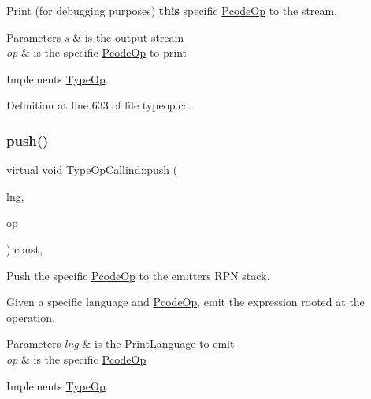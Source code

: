 Print (for debugging purposes) {\bfseries{this}} specific \mbox{\hyperlink{class_pcode_op}{Pcode\+Op}} to the stream. 


\begin{DoxyParams}{Parameters}
{\em s} & is the output stream \\
\hline
{\em op} & is the specific \mbox{\hyperlink{class_pcode_op}{Pcode\+Op}} to print \\
\hline
\end{DoxyParams}


Implements \mbox{\hyperlink{class_type_op_a60717e486917a30cc7cb6e3ce02585e1}{Type\+Op}}.



Definition at line 633 of file typeop.\+cc.

\mbox{\label{class_type_op_callind_adcb3858720f0774e85cb5e2e7ced8abd}} 
\subsubsection{\texorpdfstring{push()}{push()}}
{\footnotesize\ttfamily virtual void Type\+Op\+Callind\+::push (\begin{DoxyParamCaption}\item[{\mbox{\hyperlink{class_print_language}{Print\+Language}} $\ast$}]{lng,  }\item[{const \mbox{\hyperlink{class_pcode_op}{Pcode\+Op}} $\ast$}]{op }\end{DoxyParamCaption}) const\hspace{0.3cm}{\ttfamily [inline]}, {\ttfamily [virtual]}}



Push the specific \mbox{\hyperlink{class_pcode_op}{Pcode\+Op}} to the emitter\textquotesingle{}s R\+PN stack. 

Given a specific language and \mbox{\hyperlink{class_pcode_op}{Pcode\+Op}}, emit the expression rooted at the operation. 
\begin{DoxyParams}{Parameters}
{\em lng} & is the \mbox{\hyperlink{class_print_language}{Print\+Language}} to emit \\
\hline
{\em op} & is the specific \mbox{\hyperlink{class_pcode_op}{Pcode\+Op}} \\
\hline
\end{DoxyParams}


Implements \mbox{\hyperlink{class_type_op_ac9c9544203ed74dabe6ac662b653b2af}{Type\+Op}}.



